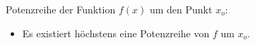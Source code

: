 Potenzreihe der Funktion $f(x)$ um den Punkt $x_o$:
\begin{itemize}
    \item Es existiert höchstens eine Potenzreihe von $f$ um $x_o$.
\end{itemize}
\vspace{1pt}
